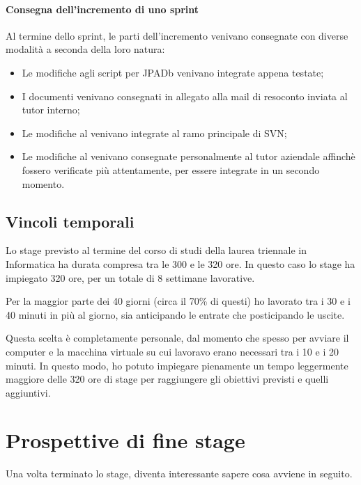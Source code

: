 \paragraph{Consegna dell'incremento di uno sprint} \mbox{}

Al termine dello sprint, le parti dell'incremento venivano consegnate con 
diverse modalità a seconda della loro natura:

\begin{itemize}
\item Le modifiche agli script per JPADb venivano integrate appena testate;
\item I documenti venivano consegnati in allegato alla mail di resoconto
  inviata al tutor interno;
\item Le modifiche al \BKEND{} venivano integrate al ramo principale di SVN;
\item Le modifiche al \FREND{} venivano consegnate personalmente al tutor
  aziendale affinchè fossero verificate più attentamente, per essere integrate
  in un secondo momento.
\end{itemize}

\subsection{Vincoli temporali}

Lo stage previsto al termine del corso di studi della laurea triennale in
Informatica ha durata compresa tra le 300 e le 320 ore. In questo caso lo
stage ha impiegato 320 ore, per un totale di 8 settimane lavorative.

Per la maggior parte dei 40 giorni (circa il 70\% di questi) ho lavorato tra i
30 e i 40 minuti in più al giorno, sia anticipando le entrate che posticipando
le uscite.

Questa scelta è completamente personale, dal momento che spesso per avviare il
computer e la macchina virtuale su cui lavoravo erano necessari tra i 10 e i
20 minuti. In questo modo, ho potuto impiegare pienamente un tempo leggermente
maggiore delle 320 ore di stage per raggiungere gli obiettivi previsti e
quelli aggiuntivi.

\section{Prospettive di fine stage}

Una volta terminato lo stage, diventa interessante sapere cosa avviene in
seguito.

